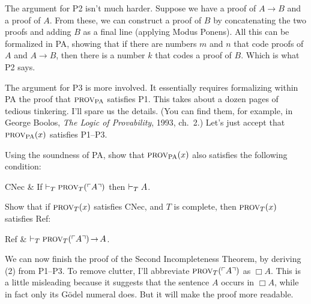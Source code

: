The argument for P2 isn't much harder.
Suppose we have a proof of $A \to B$ and a proof of $A$.
From these,
we can construct a proof of $B$
by concatenating the two proofs and adding $B$ as a final line
(applying Modus Ponens).
All this can be formalized in PA,
showing that if there are numbers $m$ and $n$ that code proofs of $A$ and $A \to B$,
then there is a number $k$ that codes a proof of $B$.
Which is what P2 says.

The argument for P3 is more involved.
It essentially requires formalizing within PA
the proof that $\smallcaps{Prov}_{\mathrm{PA}}$ satisfies P1.
This takes about a dozen pages of tedious tinkering.
I'll spare us the details.
(You can find them,
for example,
in George Boolos, \emph{The Logic of Provability}, 1993, ch.~2.)
Let's just accept that
$\smallcaps{Prov}_{\mathrm{PA}}(x)$ satisfies P1--P3.

\begin{exercise}\label{ex:denec}
  Using the soundness of PA,
  show that $\smallcaps{Prov}_{\mathrm{PA}}(x)$ also satisfies the following condition:
  \vspace{-0.2em}
  \begin{axioms}
    CNec & If $\proves_{T} \smallcaps{Prov}_T(\gn{A})$ then $\vdash_{T} A$.
  \end{axioms}
  \vspace{-1em}
\end{exercise}

\begin{exercise}\label{ex:ref}
  Show that if $\smallcaps{Prov}_T(x)$ satisfies CNec,
  and $T$ is complete,
  then $\smallcaps{Prov}_T(x)$ satisfies Ref:
  \vspace{-0.2em}
  \begin{axioms}
    Ref & $\proves_{T} \smallcaps{Prov}_T(\gn{A}) \to A$.
  \end{axioms}
  \vspace{-1em}
\end{exercise}

We can now finish the proof of the Second Incompleteness Theorem,
by deriving (2) from P1--P3.
To remove clutter,
I'll abbreviate $\smallcaps{Prov}_{T}(\gn{A})$ as $\Box A$.
This is a little misleading because
it suggests that the sentence $A$ occurs in $\Box A$,
while in fact only its Gödel numeral does.
But it will make the proof more readable.

